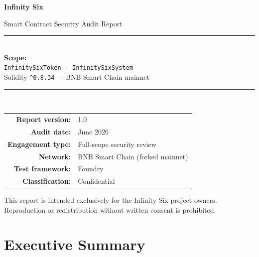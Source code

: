 \documentclass[11pt,a4paper]{article}
\begin{document}
\begin{titlepage}
\centering
\vspace*{1.5cm}

{\Huge\bfseries\color{i6primary} Infinity Six \par}
\vspace{0.4cm}
{\LARGE\color{i6gray} Smart Contract Security Audit Report \par}

\vspace{1.5cm}
\rule{0.7\textwidth}{0.8pt}\\[0.6cm]

{\Large\bfseries Scope:}\\[0.3cm]
{\large \texttt{InfinitySixToken} \,\,$\cdot$\,\, \texttt{InfinitySixSystem}}\\[0.2cm]
{\large Solidity \texttt{\^{}0.8.34} \,\,$\cdot$\,\, BNB Smart Chain mainnet}

\vspace{0.8cm}
\rule{0.7\textwidth}{0.8pt}\\[1.5cm]

\begin{tabular}{rl}
\textbf{Report version:} & 1.0 \\[0.15cm]
\textbf{Audit date:} & June 2026 \\[0.15cm]
\textbf{Engagement type:} & Full-scope security review \\[0.15cm]
\textbf{Network:} & BNB Smart Chain (forked mainnet) \\[0.15cm]
\textbf{Test framework:} & Foundry \\[0.15cm]
\textbf{Classification:} & Confidential
\end{tabular}

\vfill
{\small\color{i6gray}This report is intended exclusively for the Infinity Six project owners.}\\
{\small\color{i6gray}Reproduction or redistribution without written consent is prohibited.}

\end{titlepage}

\tableofcontents
\newpage

\section{Executive Summary}
\end{document}
